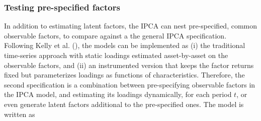 \documentclass[
  12pt,
  a4paper,
  openany]{scrbook}
\begin{document}
\hfill\break
\hfill\break

\subsubsection{Testing pre-specified
factors}\label{testing-pre-specified-factors}

In addition to estimating latent factors, the IPCA can nest
pre-specified, common observable factors, to compare against a the
general IPCA specification. Following Kelly et al.
(), the models can be
implemented as (i) the traditional time-series approach with static
loadings estimated asset-by-asset on the observable factors, and (ii) an
instrumented version that keeps the factor returns fixed but
parameterizes loadings as functions of characteristics. Therefore, the
second specification is a combination between pre-specifying observable
factors in the IPCA model, and estimating its loadings dynamically, for
each period \(t\), or even generate latent factors additional to the
pre-specified ones. The model is written as
\end{document}
